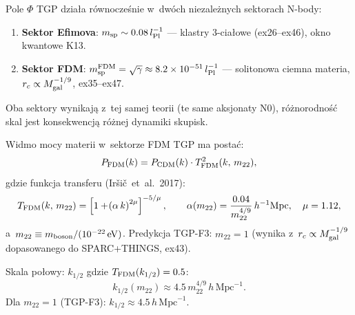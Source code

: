 \begin{remark}\label{rem:fdm-tgp-sector}
Pole $\Phi$ TGP dzia\l{}a r\'ownocze\'snie w~dw\'och niezale\.znych
sektorach N-body:
\begin{enumerate}
  \item \textbf{Sektor Efimova}: $m_{\rm sp} \sim 0.08\,l_{\rm Pl}^{-1}$ ---
    klastry 3-cia\l{}owe (ex26--ex46), okno kwantowe K13.
  \item \textbf{Sektor FDM}: $m_{\rm sp}^{\rm FDM} = \sqrt{\gamma}
    \approx 8.2\times10^{-51}\,l_{\rm Pl}^{-1}$ --- solitonowa ciemna
    materia, $r_c \propto M_{\rm gal}^{-1/9}$, ex35--ex47.
\end{enumerate}
Oba sektory wynikaj\k{a} z~tej samej teorii (te same aksjonaty N0),
r\'o\.znorodno\'s\'c skal jest konsekwencj\k{a} r\'o\.znej dynamiki
skupisk.
\end{remark}

\begin{proposition}\label{prop:fdm-transfer}
Widmo mocy materii w~sektorze FDM TGP ma posta\'c:
\begin{equation}\label{eq:P-fdm}
  P_{\rm FDM}(k) = P_{\rm CDM}(k)\cdot T_{\rm FDM}^2(k,\,m_{22}),
\end{equation}
gdzie funkcja transferu (Ir\v{s}i\v{c}~et~al.\ 2017):
\begin{equation}\label{eq:T-fdm}
  T_{\rm FDM}(k,\,m_{22}) =
    \left[1 + \!\left(\alpha\,k\right)^{2\mu}\right]^{-5/\mu},
  \qquad
  \alpha(m_{22}) = \frac{0.04}{m_{22}^{4/9}}\,h^{-1}\mathrm{Mpc},
  \quad \mu = 1.12,
\end{equation}
a~$m_{22} \equiv m_{\rm boson}/(10^{-22}\,\mathrm{eV})$.
Predykcja TGP-F3: $m_{22} = 1$ (wynika z~$r_c \propto M_{\rm gal}^{-1/9}$
dopasowanego do SPARC+THINGS, ex43).

Skala po\l{}owy: $k_{1/2}$ gdzie $T_{\rm FDM}(k_{1/2}) = 0.5$:
\begin{equation}\label{eq:k-half}
  k_{1/2}(m_{22}) \approx 4.5\,m_{22}^{4/9}\,h\,\mathrm{Mpc}^{-1}.
\end{equation}
Dla $m_{22}=1$ (TGP-F3): $k_{1/2} \approx 4.5\,h\,\mathrm{Mpc}^{-1}$.
\end{proposition}

